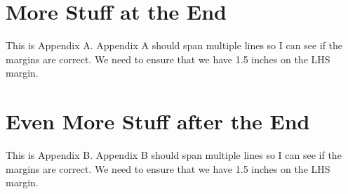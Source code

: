 \documentclass[11pt,phd]{uddissert2023}
\begin{document}
\pagestyle{plain}

%








\appendix

\begin{appendices}
	\appendix
	
    \chapter{More Stuff at the End}

    This is Appendix A.  Appendix A should span multiple lines so I can see if the margins are correct.  We need to ensure that we have 1.5 inches on the LHS margin.

    \chapter{Even More Stuff after the End}

    This is Appendix B.  Appendix B should span multiple lines so I can see if the margins are correct.  We need to ensure that we have 1.5 inches on the LHS margin.

\end{appendices}
\end{document}
